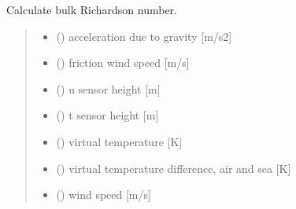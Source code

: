 \documentclass[letterpaper,10pt,english]{sphinxmanual}
\begin{document}
\begin{fulllineitems}
\label{\detokenize{users_guide:AirSeaFluxCode.flux_subs.get_Rb}}
\pysigstartsignatures
{}
\pysigstopsignatures
\sphinxAtStartPar
Calculate bulk Richardson number.
\begin{quote}\begin{description}
\begin{itemize}
\item {} 
\sphinxAtStartPar
{} () \textendash{} acceleration due to gravity {[}m/s2{]}

\item {} 
\sphinxAtStartPar
{} () \textendash{} friction wind speed {[}m/s{]}

\item {} 
\sphinxAtStartPar
{} () \textendash{} u sensor height {[}m{]}

\item {} 
\sphinxAtStartPar
{} () \textendash{} t sensor height {[}m{]}

\item {} 
\sphinxAtStartPar
{} () \textendash{} virtual temperature {[}K{]}

\item {} 
\sphinxAtStartPar
{} () \textendash{} virtual temperature difference, air and sea {[}K{]}

\item {} 
\sphinxAtStartPar
{} () \textendash{} wind speed {[}m/s{]}


\end{itemize}
\end{description}
\end{quote}
\end{fulllineitems}
\end{document}
